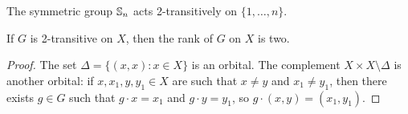 The symmetric group $\mathbb{S}_n$ acts 2-transitively on $\{1,\dots,n\}$. 

\begin{proposition}
    If $G$ is 2-transitive on $X$, then the rank of $G$ on $X$ is two. 
\end{proposition}

\begin{proof}
    The set $\Delta=\{(x,x):x\in X\}$ is an orbital. The complement
    $X\times X\setminus\Delta$ is another orbital: if $x,x_1,y,y_1\in X$
    are such that $x\ne y$ 
    and $x_1\ne y_1$, then there exists $g\in G$ such that 
    $g\cdot x=x_1$ and $g\cdot y=y_1$, so $g\cdot (x,y)=(x_1,y_1)$. 
\end{proof}



